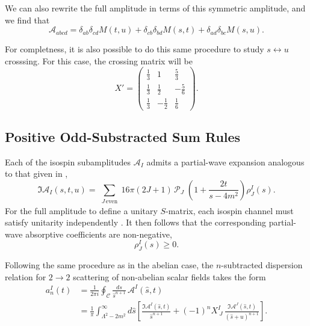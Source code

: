 We can also rewrite the full amplitude in terms of this symmetric amplitude, and we find that 
\begin{equation}
    \mathcal{A}_{abcd} = \delta_{ab} \delta_{cd} M(t, u) +  \delta_{cb}\delta_{bd} M(s, t) + \delta_{ad} \delta_{bc} M(s, u).
    \label{eq:nonabscalar}
\end{equation}

For completness, it is also possible to do this same procedure to study $s \leftrightarrow u$ crosssing. For this case, the crossing matrix will be 
$$
X' = \begin{pmatrix}
    \frac{1}{3} & 1 & \frac{5}{3} \\
    \frac{1}{3} & \frac{1}{2} & -\frac{5}{6} \\
    \frac{1}{3} & -\frac{1}{2} & \frac{1}{6}
    \end{pmatrix}.
$$

\subsection{Positive Odd-Substracted Sum Rules}
\label{sec:nopos}

Each of the isospin subamplitudes $\mathcal{A}_I$ admits a partial-wave expansion analogous to that given in ,
\begin{equation}
    \Im \mathcal{A}_I(s,t,u)
    =
    \sum_{\substack{J\,\mathrm{even}}}
    16\pi(2J+1)\,
    \mathcal{P}_J\;\left(1+\frac{2t}{s-4m^2}\right)
    \rho_J^I(s).
\end{equation}
For the full amplitude to define a unitary $S$-matrix, each isospin channel must satisfy unitarity independently \autocite{Manohar:2008tc}. It then follows that the corresponding partial-wave absorptive coefficients are non-negative,
\begin{equation}
    \rho_J^I(s)\geq 0.
\end{equation}


Following the same procedure as in the abelian case, the $n$-subtracted dispersion relation for $2 \rightarrow 2$ scattering of non-abelian scalar fields takes the form
\begin{equation}
    \begin{split}
        a_n^I(t)
        &= \frac{1}{2 \pi i} \oint_{\mathcal{C}} \frac{ds}{\hat{s}^{n+1}} \, \mathcal{A}^I(\hat{s}, t) \\
        &= \frac{1}{\pi} \int_{\Lambda^2 - 2m^2}^{\infty} d\hat{s}
        \left[
            \frac{\Im \mathcal{A}^I(\hat{s}, t)}{\hat{s}^{n+1}}
            + (-1)^n X^{I}_{\ J}\,\frac{\Im \mathcal{A}^J(\hat{s}, t)}{(\hat{s}+u)^{n+1}}
        \right].
    \end{split}
    \label{eq:highennonab}
\end{equation}

